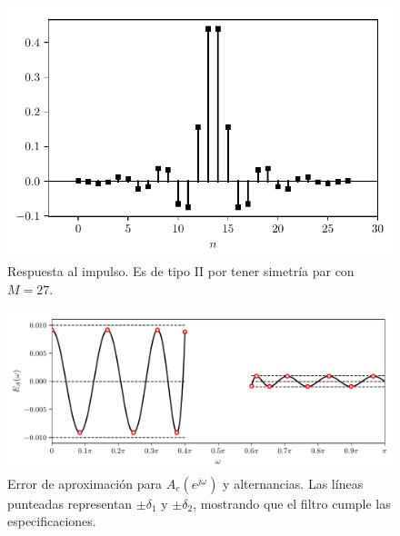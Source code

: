 \documentclass[a4paper]{report}
\begin{document}
\begin{figure}[!htb]
  \begin{minipage}[c]{0.7\textwidth}
    \includegraphics[width=\textwidth]{figuras/filter_design_example_07_05_with_pm_impulse_response.pdf}
  \end{minipage}\hfill
  \begin{minipage}[c]{0.3\textwidth}
    \caption{
      Respuesta al impulso. Es de tipo II por tener simetría par con \(M=27\).
    }\label{fig:filter_design_example_07_05_with_pm_impulse_response}
  \end{minipage}
\end{figure}
\begin{figure}[!htb]
 \begin{center}
 \includegraphics[width=1\textwidth]{figuras/filter_design_example_07_05_with_pm_aprox_error.pdf}
 \caption{\label{fig:filter_design_example_07_05_with_pm_aprox_error} Error de aproximación para \(A_e(e^{j\omega})\) y alternancias. Las líneas punteadas representan \(\pm\delta_1\) y \(\pm\delta_2\), mostrando que el filtro cumple las especificaciones.}
 \end{center}
\end{figure}
\end{document}

